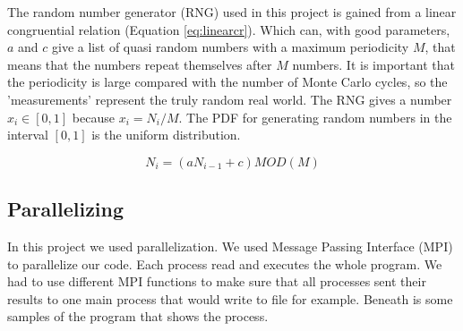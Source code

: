 The random number generator (RNG) used in this project is gained from a linear congruential relation (Equation \ref{eq:linearcr}). Which can, with good parameters, $a$ and $c$ give a list of quasi random numbers with a maximum periodicity $M$, that means that the numbers repeat themselves after $M$ numbers. It is important that the periodicity is large compared with the number of Monte Carlo cycles, so the 'measurements' represent the truly random real world. The RNG gives a number $x_i \in [0,1]$ because $x_i = N_i/M$. The PDF for generating random numbers in the interval $[0,1]$ is the uniform distribution.

\begin{equation}\label{eq:linearcr}
N_i = (aN_{i-1} + c)MOD(M)
\end{equation}
%
%
%
%
%    
%       
%           
%
%           

\subsection{Parallelizing}

In this project we used parallelization. We used Message Passing Interface (MPI) to parallelize our code. Each process read and executes the whole program. We had to use different MPI functions to make sure that all processes sent their results to one main process that would write to file for example. Beneath is some samples of the program that shows the process. 

